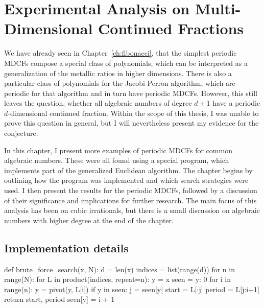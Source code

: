 \chapter{Experimental Analysis on Multi-Dimensional Continued Fractions}
\label{ch:implementation}

We have already seen in Chapter~\ref{ch:fibonacci},
that the simplest periodic MDCFs compose a special class of polynomials,
which can be interpreted as a generalization of the metallic ratios in higher
dimensions.
There is also a particular class of polynomials for the Jacobi-Perron algorithm,
which are periodic for that algorithm and in turn have periodic MDCFs.
However, this still leaves the question, whether all algebraic numbers of degree $d+1$
have a periodic $d$-dimensional continued fraction.
Within the scope of this thesis, I was unable to prove this question in
general, but I will nevertheless present my evidence for the conjecture.

In this chapter, I present more examples of periodic MDCFs for common algebraic numbers.
These were all found using a special program, which implements part of the generalized Euclidean algorithm.
The chapter begins by outlining how the program was implemented and which search strategies were used.
I then present the results for the periodic MDCFs, followed by a discussion of
their significance and implications for further research.
The main focus of this analysis has been on cubic irrationals,
but there is a small discussion on algebraic numbers with higher degree at the end of the chapter.

\section{Implementation details}

\begin{Python}[
    float=tbp,
    numbers=left,
    label={lst:bfs},
    caption={
      The implementation of the brute-force search for finding a periodic representation.
      The program iterates over all sequences with a maximum length of $N$
      until it finds a duplicate vector.
    }
  ]
def brute_force_search(x, N):
  d = len(x)
  indices = list(range(d))
  for n in range(N):
    for L in product(indices, repeat=n):
      y = x
      seen = {y: 0}
      for i in range(n):
        y = pivot(y, L[i])
        if y in seen:
          j = seen[y]
          start = L[:j]
          period = L[j:i+1]
          return start, period
        seen[y] = i + 1
\end{Python}

